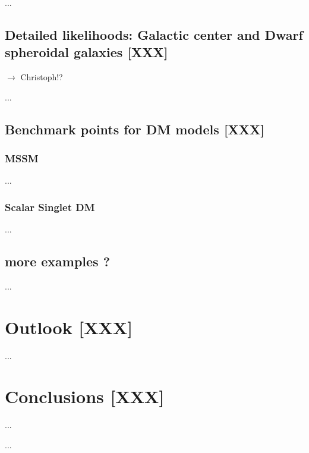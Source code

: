 \medskip
...

\subsection{Detailed likelihoods: Galactic center and Dwarf spheroidal galaxies {\bf [XXX]}}

$\to$ Christoph!?

\medskip
...


\subsection{Benchmark points for DM models {\bf [XXX]}}

\subsubsection{MSSM}
...

\subsubsection{Scalar Singlet DM}
...

\subsection{more examples ?}
...

\section{Outlook {\bf [XXX]}}
\label{out}

...

\section{Conclusions {\bf [XXX]} }
\label{conc}

...

\begin{acknowledgements}
...
\end{acknowledgements}



